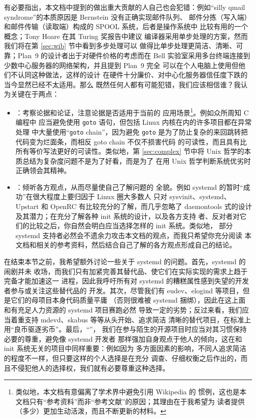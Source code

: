有必要指出，本文档中提到的做出重大贡献的人自己也会犯错：例如“silly qmail
syndrome”的本质原因是 Bernstein 没有正确实现邮件队列、
邮件分拣（写入端）和邮件传输（读取端）构成的 SPOOL 系统，后者是操作系统中
比较有用的一个概念；Tony Hoare 在其 Turing 奖报告中建议
编译器采用单步处理的方案，然而我们将在第 \ref{sec:wib} 节中看到多步处理可以
做得比单步处理更简洁、清晰、可靠；Plan~9 的设计者出于对硬件价格的考虑而在
Bell 实验室采用多台终端连接到少数中心服务器的网络架构，并且提到 Plan~9 完全
可以在个人电脑上使用但他们不认同这种做法，这样的设计
在硬件十分廉价、对中心化服务器信任度下跌的当今显然已经不太适用。那么
既然任何人都有可能犯错，我们应该相信谁？我认为关键在于两点：
\begin{itemize}
\item {}：考察论据和论证，注意论据是否适用于当前的
	应用场景\footnote{类似地，本文档有意偏离了学术界中避免引用 Wikipedia 的
	惯例，这也是本文档只有“参考资料”而非“参考文献”的原因；其理由在于我希望为
	读者提供（多少）更加生动活泼，而且不断更新的材料。}。例如众所周知 C 编程中
	应当避免使用 \verb|goto| 语句，但包括 Linux 内核在内的许多项目都在异常处理
	中大量使用“\verb|goto| chain”，因为避免 \verb|goto|
	是为了防止复杂的来回跳转把代码变为烂面条，而相反 goto chain 不仅不损害代码
	的可读性，而且具有比所有等价写法更好的可读性。类似地，第 \ref{sec:complex}
	节中将 Unix 哲学的本质总结为复杂度问题不是为了好看，而是为了
	在用 Unix 哲学判断系统优劣时正确领会其精神。
\item {}：倾听各方观点，从而尽量使自己了解问题的
	全貌。例如 systemd 的暂时“成功”在很大程度上要归因于 Linux 圈大多数人
	只对 sysvinit、systemd、Upstart 和 OpenRC 有比较充分的了解，而几乎忽略了
	daemontools 式的设计及其潜力；在充分了解各种 init 系统的设计，以及各方支持
	者、反对者对它们的比较之后，你自然会明白应当选择怎样的 init 系统。类似地，
	部分 systemd 支持者必然会不遗余力攻击本文档的观点，而我只希望你充分阅读
	本文档和相关的参考资料，然后结合自己了解的各方观点形成自己的结论。
\end{itemize}

在结束本节之前，我希望额外讨论一些关于 systemd 的问题。首先，systemd 的闹剧并未
收场，而我们只有加紧完善其替代品、使它们在实际实现的需求上趋于完备才能加速这一
进程，因此我呼吁所有对 systemd 的糟糕属性感到失望的开发者参与或关注这些替代品的
开发。其次，尽管我们有 eudev、elogind 等项目，但是它们的母项目本身代码质量平庸
（否则很难被 systemd 捆绑），因此在这上面和有充足人力资源的 systemd 项目赛跑必然
导致一定的劣势；反过来看，我们应当着重支持 mdevd、skabus 等等从头开始、追求简洁
清晰的替代项目，在标准上用“良币驱逐劣币”。最后，“”，
我们在参与陌生的开源项目时应当对其习惯保持必要的尊重，避免像 systemd 开发者
那样强加自身观点于他人的倾向，这在和 init 系统无关的项目中同样重要：例如因为
多方面因素的影响，不同人追求简洁的程度不一样，但只要这样的个人选择是在充分
调查、仔细权衡之后作出的，而且不侵犯他人的选择权，我们就有必要尊重这种选择。


